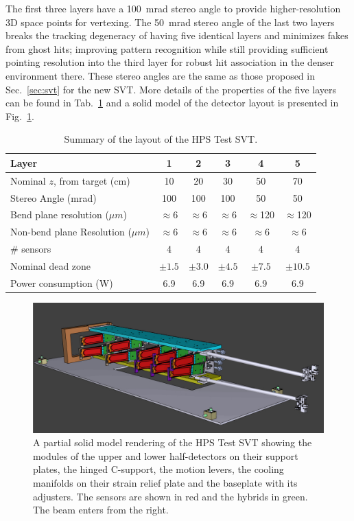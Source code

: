 The first three layers have a 100~mrad stereo angle to provide higher-resolution 3D space points for 
vertexing. The 50~mrad stereo angle of the last two layers breaks the tracking degeneracy of having five 
identical layers and minimizes fakes from ghost hits; improving pattern recognition while still providing 
sufficient pointing resolution into the third layer for robust hit association in the denser environment there. 
These stereo angles are the same as those proposed in Sec.~\ref{sec:svt} for the new SVT. More details 
of the properties of the five layers can be found in Tab.~\ref{tab:trk} and a solid model of the detector layout 
is presented in Fig.~\ref{fig:tracker_model}.  
\begin{table}[h]
\begin{center}
\begin{tabular}{lccccc}   
\hline \hline 
    Layer & 1 & 2 & 3 & 4 & 5 \\      
\hline
    Nominal $z$, from target (cm)  & 10 & 20 & 30 & 50 & 70  \\ 
    Stereo Angle (mrad)  & 100 & 100 & 100 & 50 & 50 \\ 
    Bend plane resolution ($\mu m$)  & $\approx$6 & $\approx$6 & $\approx$6 & $\approx$120 & $\approx$120  \\ 
    Non-bend plane Resolution ($\mu m$)  & $\approx$6 & $\approx$6 & $\approx$6 & $\approx$6 & $\approx$6  \\ 
    \# sensors  & 4 & 4 & 4 & 4 & 4  \\ 
    Nominal dead zone  & $\pm1.5$  & $\pm3.0$  & $\pm4.5$  & $\pm7.5$  & $\pm10.5$  \\ 
    Power consumption (W) & 6.9 & 6.9 & 6.9 & 6.9 & 6.9 \\
\hline \hline
\end{tabular}
\caption[]{Summary of the layout of the HPS Test SVT. }
\label{tab:trk} 
\end{center}
\end{table}
\begin{figure}[ht]
    \includegraphics[width=\textwidth]{test2012/HPS_nocables_nowires}
\caption{\small{A partial solid model rendering of the HPS Test SVT showing the modules of the upper and 
lower half-detectors on their support plates, the hinged C-support, the motion levers, the cooling manifolds on 
their strain relief plate and the baseplate with its adjusters.  The sensors are shown in red and the hybrids in 
green. The beam enters from the right.} }
\label{fig:tracker_model}
\end{figure}

